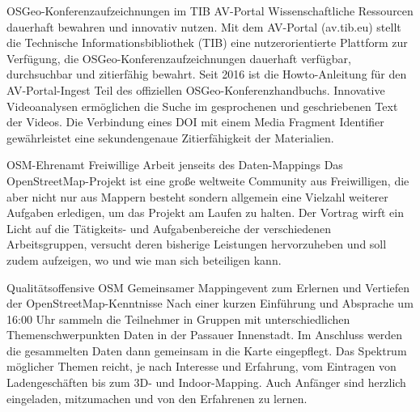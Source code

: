 %
{OSGeo-Konferenzaufzeichnungen im TIB AV-Portal\vspace{0.2\baselineskip}}%
{Wissenschaftliche Ressourcen dauerhaft bewahren und innovativ nutzen.}%
{Mit dem AV-Portal (av.tib.eu) stellt die Technische Informationsbibliothek (TIB) eine
nutzerorientierte Plattform zur Verfügung, die OSGeo-Konferenzaufzeichnungen dauerhaft verfügbar,
durchsuchbar und zitierfähig bewahrt. Seit 2016 ist die Howto-Anleitung für den AV-Portal-Ingest
Teil des offiziellen OSGeo-Konferenzhandbuchs. Innovative  Videoanalysen ermöglichen die Suche im
gesprochenen und geschriebenen Text der Videos. Die Verbindung eines DOI mit einem Media Fragment
Identifier gewährleistet eine sekundengenaue Zitierfähigkeit der Materialien.}



%
{OSM-Ehrenamt}%
{Freiwillige Arbeit jenseits des Daten-Mappings}%
{Das OpenStreetMap-Projekt ist eine große weltweite Community aus
Freiwilligen, die aber nicht nur aus Mappern besteht sondern allgemein
eine Vielzahl weiterer Aufgaben erledigen, um das
Projekt am Laufen zu halten. Der Vortrag wirft ein Licht auf die
Tätigkeits- und Aufgabenbereiche der verschiedenen Arbeitsgruppen,
versucht deren bisherige Leistungen hervorzuheben und soll zudem
aufzeigen, wo und wie man sich beteiligen kann.}

\abstractDreizehn{}%
{Qualitätsoffensive OSM}%
{Gemeinsamer Mappingevent zum Erlernen und Vertiefen der OpenStreetMap-Kenntnisse}%
{Nach einer kurzen Einführung und Absprache um 16:00 Uhr sammeln die Teilnehmer in Gruppen
mit unterschiedlichen Themenschwerpunkten Daten in der Passauer Innenstadt. Im Anschluss
werden die gesammelten Daten dann gemeinsam in die Karte eingepflegt.
Das Spektrum möglicher Themen reicht, je nach Interesse und Erfahrung, vom Eintragen von
Ladengeschäften bis zum 3D- und Indoor-Mapping. Auch Anfänger sind herzlich eingeladen,
mitzumachen und von den Erfahrenen zu lernen.}


\vfill

\vfill



\vfill


